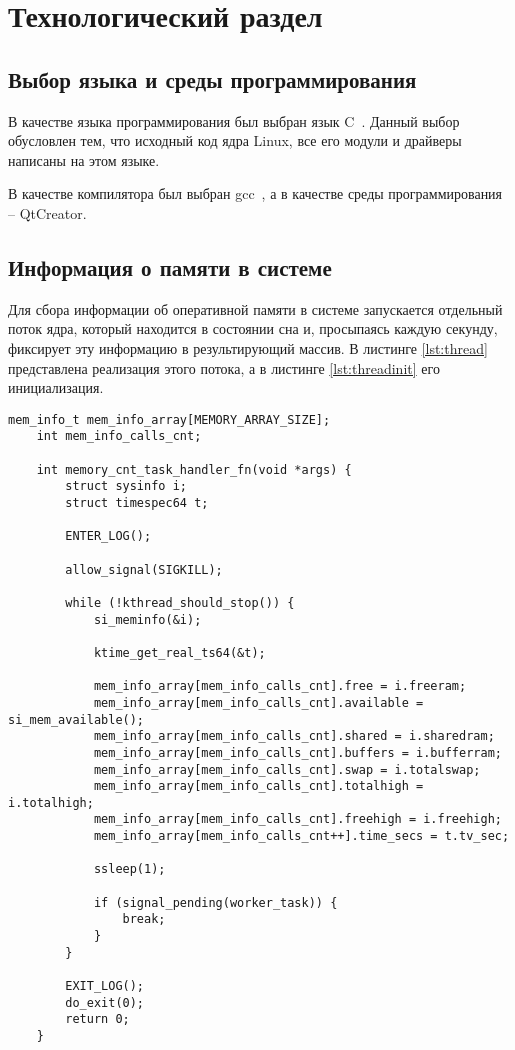 \section{Технологический раздел}

\subsection{Выбор языка и среды программирования}

В качестве языка программирования был выбран язык C~\cite{c99}. Данный выбор обусловлен тем, что исходный код ядра Linux, все его модули и драйверы написаны на этом языке.

В качестве компилятора был выбран gcc~\cite{gcc}, а в качестве среды программирования -- QtCreator.

\subsection{Информация о памяти в системе}

Для сбора информации об оперативной памяти в системе запускается отдельный поток ядра, который находится в состоянии сна и, просыпаясь каждую секунду, фиксирует эту информацию в результирующий массив. В листинге \ref{lst:thread} представлена реализация этого потока, а в листинге \ref{lst:threadinit} его инициализация.

\begin{lstlisting}[label={lst:thread}, caption={реализация функции сохраняющей информацию о памяти}]
	mem_info_t mem_info_array[MEMORY_ARRAY_SIZE];
	int mem_info_calls_cnt;
	
	int memory_cnt_task_handler_fn(void *args) {
		struct sysinfo i;
		struct timespec64 t;
		
		ENTER_LOG();
		
		allow_signal(SIGKILL);
		
		while (!kthread_should_stop()) {
			si_meminfo(&i);
			
			ktime_get_real_ts64(&t);
			
			mem_info_array[mem_info_calls_cnt].free = i.freeram;
			mem_info_array[mem_info_calls_cnt].available = si_mem_available();
			mem_info_array[mem_info_calls_cnt].shared = i.sharedram;
			mem_info_array[mem_info_calls_cnt].buffers = i.bufferram;
			mem_info_array[mem_info_calls_cnt].swap = i.totalswap;
			mem_info_array[mem_info_calls_cnt].totalhigh = i.totalhigh;
			mem_info_array[mem_info_calls_cnt].freehigh = i.freehigh;
			mem_info_array[mem_info_calls_cnt++].time_secs = t.tv_sec;
			
			ssleep(1);
			
			if (signal_pending(worker_task)) {
				break;
			}
		}
		
		EXIT_LOG();
		do_exit(0);
		return 0;
	}
\end{lstlisting}

